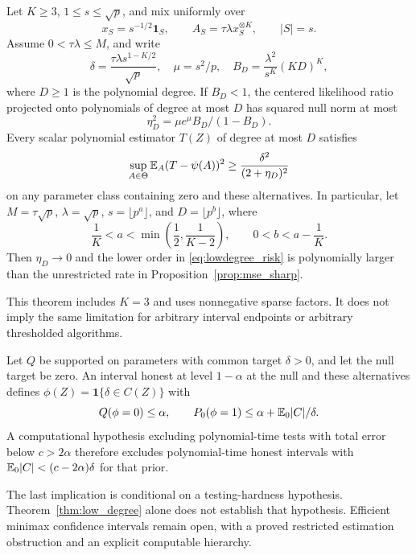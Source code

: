\begin{theorem}\label{thm:low_degree}
Let $K\ge3$, $1\le s\le\sqrt p$, and mix uniformly over
\[
 x_S=s^{-1/2}\mathbf1_S,\qquad
 A_S=\tau\lambda x_S^{\otimes K},\qquad |S|=s.
\]
Assume $0<\tau\lambda\le M$, and write
\[
 \delta=\frac{\tau\lambda s^{1-K/2}}{\sqrt p},\quad
 \mu=s^2/p,\quad B_D=\frac{\lambda^2}{s^K}(KD)^K,
\]
where $D\ge1$ is the polynomial degree. If $B_D<1$, the centered likelihood ratio projected onto polynomials of degree at most $D$ has squared null norm at most
\[
 \eta_D^2=\mu e^\mu B_D/(1-B_D).
\]
Every scalar polynomial estimator $T(Z)$ of degree at most $D$ satisfies
\begin{equation}\label{eq:lowdegree_risk}
 \sup_{A\in\Theta}\mathbb E_A(T-\psi(A))^2
       \ge\frac{\delta^2}{(2+\eta_D)^2}
\end{equation}
on any parameter class containing zero and these alternatives.
In particular, let $M=\tau\sqrt p$, $\lambda=\sqrt p$,
$s=\lfloor p^a\rfloor$, and $D=\lfloor p^b\rfloor$, where
\[
 \frac1K<a<\min\left(\frac12,\frac1{K-2}\right),
 \qquad 0<b<a-\frac1K.
\]
Then $\eta_D\to0$ and the lower order in \eqref{eq:lowdegree_risk} is polynomially larger than the unrestricted rate in Proposition~\ref{prop:mse_sharp}.
\end{theorem}

This theorem includes $K=3$ and uses nonnegative sparse factors. It does not imply the same limitation for arbitrary interval endpoints or arbitrary thresholded algorithms.

\begin{proposition}\label{prop:ci_detection}
Let $Q$ be supported on parameters with common target $\delta>0$, and let the null target be zero.
An interval honest at level $1-\alpha$ at the null and these alternatives defines
$\phi(Z)=\mathbf1\{\delta\in C(Z)\}$ with
\[
 Q(\phi=0)\le\alpha,\qquad
 P_0(\phi=1)\le\alpha+\mathbb E_0|C|/\delta.
\]
A computational hypothesis excluding polynomial-time tests with total error below $c>2\alpha$ therefore excludes polynomial-time honest intervals with
$\mathbb E_0|C|<(c-2\alpha)\delta$ for that prior.
\end{proposition}

The last implication is conditional on a testing-hardness hypothesis.
Theorem~\ref{thm:low_degree} alone does not establish that hypothesis.
Efficient minimax confidence intervals remain open, with a proved restricted estimation obstruction and an explicit computable hierarchy.
